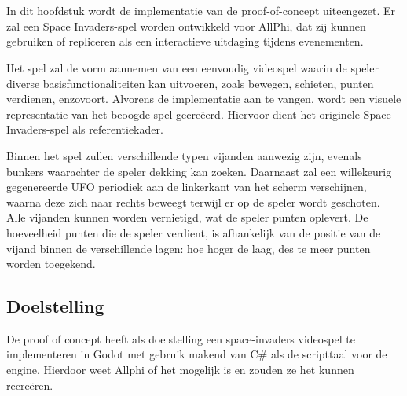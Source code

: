 
\chapter{}%
\label{ch:proof-of-concept}

In dit hoofdstuk wordt de implementatie van de proof-of-concept uiteengezet. Er zal een Space Invaders-spel worden ontwikkeld voor AllPhi, dat zij kunnen gebruiken of repliceren als een interactieve uitdaging tijdens evenementen.

Het spel zal de vorm aannemen van een eenvoudig videospel waarin de speler diverse basisfunctionaliteiten kan uitvoeren, zoals bewegen, schieten, punten verdienen, enzovoort. Alvorens de implementatie aan te vangen, wordt een visuele representatie van het beoogde spel gecreëerd. Hiervoor dient het originele Space Invaders-spel als referentiekader.

Binnen het spel zullen verschillende typen vijanden aanwezig zijn, evenals bunkers waarachter de speler dekking kan zoeken. Daarnaast zal een willekeurig gegenereerde UFO periodiek aan de linkerkant van het scherm verschijnen, waarna deze zich naar rechts beweegt terwijl er op de speler wordt geschoten. Alle vijanden kunnen worden vernietigd, wat de speler punten oplevert. De hoeveelheid punten die de speler verdient, is afhankelijk van de positie van de vijand binnen de verschillende lagen: hoe hoger de laag, des te meer punten worden toegekend.

\section{Doelstelling}
De proof of concept heeft als doelstelling een space-invaders videospel te implementeren in Godot met gebruik makend van C\# als de scripttaal voor de engine. Hierdoor weet Allphi of het mogelijk is en zouden ze het kunnen recreëren.

